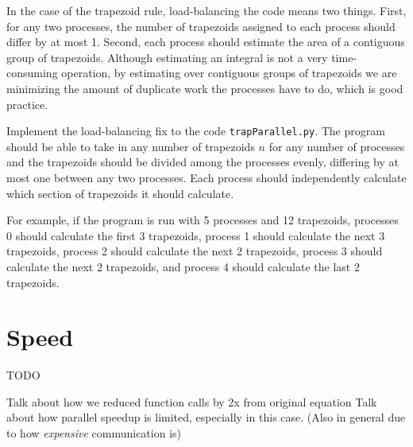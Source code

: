 In the case of the trapezoid rule, load-balancing the code means two things.
First, for any two processes, the number of trapezoids assigned to each process
should differ by at most 1. Second, each process should estimate the area of a
contiguous group of trapezoids. Although estimating an integral is not a very
time-consuming operation, by estimating over contiguous groups of trapezoids we
are minimizing the amount of duplicate work the processes have to do, which is
good practice.

\begin{problem}
Implement the load-balancing fix to the code \texttt{trapParallel.py}. The
program should be able to take in any number of trapezoids $n$ for any number of
processes and the trapezoids should be divided among the processes evenly,
differing by at most one between any two processes. Each process should
independently calculate which section of trapezoids it should calculate.

For example, if the program is run with 5 processes and 12 trapezoids, processes
0 should calculate the first 3 trapezoids, process 1 should calculate the next 3
trapezoids, process 2 should calculate the next 2 trapezoids, process 3 should
calculate the next 2 trapezoids, and process 4 should calculate the last 2
trapezoids.
\label{prob:MPI_Intro:trapParallelLoadBalanced.py}
\end{problem}

\section*{Speed}

TODO

Talk about how we reduced function calls by 2x from original equation
Talk about how parallel speedup is limited, especially in this case. (Also in general due to how \emph{expensive} communication is)
